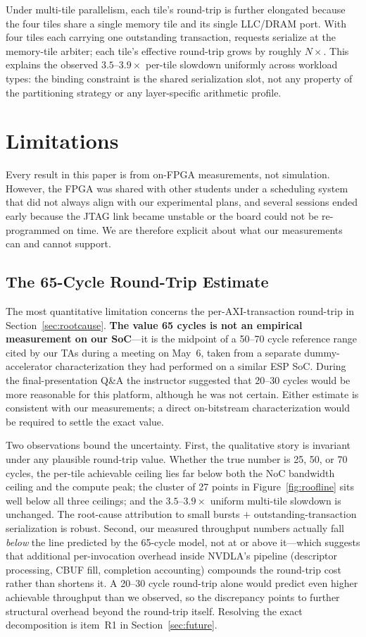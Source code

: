 \documentclass[10pt,sigconf,nonacm]{acmart}
\begin{document}
Under multi-tile parallelism, each tile's round-trip is further
elongated because the four tiles share a single memory tile and
its single LLC/DRAM port. With four tiles each carrying one
outstanding transaction, requests serialize at the memory-tile
arbiter; each tile's effective round-trip grows by roughly
$N\times$. This explains the observed
$3.5\textrm{--}3.9\times$ per-tile slowdown
uniformly across workload types: the binding constraint is the
shared serialization slot, not any property of the partitioning
strategy or any layer-specific arithmetic profile.


\section{Limitations}\label{sec:limits}

Every result in this paper is from on-FPGA measurements, not
simulation. However, the FPGA was shared with other students under
a scheduling system that did not always align with our experimental
plans, and several sessions ended early because the JTAG link became
unstable or the board could not be re-programmed on time. We are
therefore explicit about what our measurements can and cannot support.

\subsection{The 65-Cycle Round-Trip Estimate}\label{sec:65cy}
The most quantitative limitation concerns the per-AXI-transaction
round-trip in Section~\ref{sec:rootcause}. \textbf{The value 65
cycles is not an empirical measurement on our SoC}---it is the
midpoint of a 50--70 cycle reference range cited by our TAs during
a meeting on May~6, taken from a separate dummy-accelerator
characterization they had performed on a similar ESP SoC. During
the final-presentation Q\&A the instructor suggested that 20--30
cycles would be more reasonable for this platform, although he was
not certain. Either estimate is consistent with our measurements;
a direct on-bitstream characterization would be required to settle
the exact value.

Two observations bound the uncertainty. First, the qualitative
story is invariant under any plausible round-trip value. Whether
the true number is 25, 50, or 70 cycles, the per-tile achievable
ceiling lies far below both the NoC bandwidth ceiling and the
compute peak; the cluster of 27 points in Figure~\ref{fig:roofline}
sits well below all three ceilings; and the $3.5\textrm{--}3.9\times$
uniform multi-tile slowdown is unchanged. The root-cause attribution
to small bursts $+$ outstanding-transaction serialization is
robust. Second, our measured throughput numbers actually fall
\emph{below} the line predicted by the 65-cycle model, not at or
above it---which suggests that additional per-invocation overhead
inside NVDLA's pipeline (descriptor processing, CBUF fill,
completion accounting) compounds the round-trip cost rather than
shortens it. A 20--30 cycle round-trip alone would predict even
higher achievable throughput than we observed, so the discrepancy
points to further structural overhead beyond the round-trip
itself. Resolving the exact decomposition is item~R1 in
Section~\ref{sec:future}.
\end{document}
